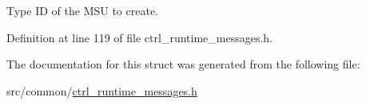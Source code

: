 Type I\-D of the M\-S\-U to create. 



Definition at line 119 of file ctrl\-\_\-runtime\-\_\-messages.\-h.



The documentation for this struct was generated from the following file\-:\begin{DoxyCompactItemize}
\item 
src/common/\hyperlink{ctrl__runtime__messages_8h}{ctrl\-\_\-runtime\-\_\-messages.\-h}\end{DoxyCompactItemize}
